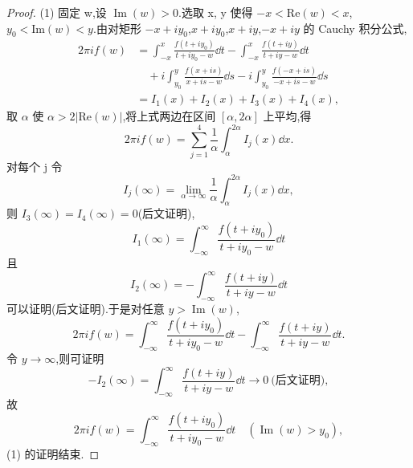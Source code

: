 \begin{proof}
(1) 固定 w,设 $\operatorname{Im}(w) > 0$.选取 x, y 使得 $-x < \mathrm{Re}(w) < x$,$y_{0} < \mathrm{Im}(w) < y$.由对矩形 $-x + iy_{0}$,$x + iy_{0}$,$x + iy$,$-x + iy$ 的 Cauchy 积分公式,
\begin{align*}
2\pi i f(w) & = \int_{-x}^{x}\frac{f(t + iy_{0})}{t + iy_{0} - w}\dd t - \int_{-x}^{x}\frac{f(t + iy)}{t + iy - w}\dd t \\
& \quad + i\int_{y_{0}}^{y}\frac{f(x + is)}{x + is - w}\dd s - i\int_{y_{0}}^{y}\frac{f(-x + is)}{-x + is - w}\dd s \\
& = I_{1}(x) + I_{2}(x) + I_{3}(x) + I_{4}(x),
\end{align*}
取 $\alpha$ 使 $\alpha > 2|\mathrm{Re}(w)|$,将上式两边在区间 $[\alpha, 2\alpha]$ 上平均,得
\begin{equation*}
2\pi i f(w) = \sum_{j=1}^{4}\frac{1}{\alpha}\int_{\alpha}^{2\alpha}I_{j}(x)\dd x.
\end{equation*}
对每个 j 令
\begin{equation*}
I_{j}(\infty) = \lim_{\alpha \to \infty}\frac{1}{\alpha}\int_{\alpha}^{2\alpha}I_{j}(x)\dd x,
\end{equation*}
则 $I_{3}(\infty) = I_{4}(\infty) = 0$(后文证明),
\begin{equation*}
I_{1}(\infty) = \int_{-\infty}^{\infty}\frac{f(t + iy_{0})}{t + iy_{0} - w}\dd t
\end{equation*}
且
\begin{equation*}
I_{2}(\infty) = -\int_{-\infty}^{\infty}\frac{f(t + iy)}{t + iy - w}\dd t
\end{equation*}
可以证明(后文证明).于是对任意 $y > \operatorname{Im}(w)$,
\begin{equation*}
2\pi i f(w) = \int_{-\infty}^{\infty}\frac{f(t + iy_{0})}{t + iy_{0} - w}\dd t - \int_{-\infty}^{\infty}\frac{f(t + iy)}{t + iy - w}\dd t.
\end{equation*}
令 $y \to \infty$,则可证明
\begin{equation*}
-I_{2}(\infty) = \int_{-\infty}^{\infty}\frac{f(t + iy)}{t + iy - w}\dd t \longrightarrow 0 \ \text{(后文证明)},
\end{equation*}
故
\begin{equation*}
2\pi i f(w) = \int_{-\infty}^{\infty}\frac{f(t + iy_{0})}{t + iy_{0} - w}\dd t \quad (\operatorname{Im}(w) > y_{0}),
\end{equation*}
(1) 的证明结束.


\end{proof}
